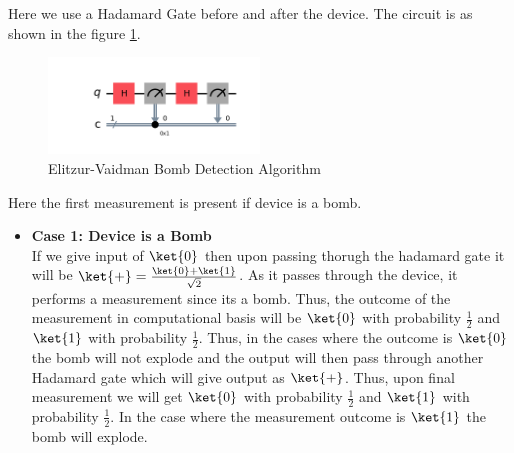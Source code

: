 \documentclass[12pt, oneside]{book}
\theoremstyle{definition}
\theoremstyle{definition}
\theoremstyle{remark}
\begin{document}
\begin{enumerate}
    Here we use a Hadamard Gate before and after the device. The circuit is as shown in the figure \ref{fig:elitzur-vaidman}.
    \begin{figure}[H]
        \centering
        \includegraphics[width=0.5\textwidth]{../images/elitzur-vaidman.png}
        \caption{Elitzur-Vaidman Bomb Detection Algorithm}
        \label{fig:elitzur-vaidman}
    \end{figure}
    Here the first measurement is present if device is a bomb.
    \begin{itemize}
        \item \textbf{Case 1: Device is a Bomb}\\
        If we give input of $\ket{0}$ then upon passing thorugh the hadamard gate it will be $\ket{+}=\frac{\ket{0}+\ket{1}}{\sqrt{2}}$. As it passes through the device,
        it performs a measurement since its a bomb. Thus, the outcome of the measurement in computational basis will be $\ket{0}$ with probability $\frac{1}{2}$ and $\ket{1}$ with probability $\frac{1}{2}$.
        Thus, in the cases where the outcome is $\ket{0}$ the bomb will not explode and the output will then pass through another Hadamard gate which will give output as $\ket{+}$. Thus, upon final measurement we will get 
        $\ket{0}$ with probability $\frac{1}{2}$ and $\ket{1}$ with probability $\frac{1}{2}$. In the case where the measurement outcome is $\ket{1}$ the bomb will explode.


\end{itemize}
\end{enumerate}
\end{document}
